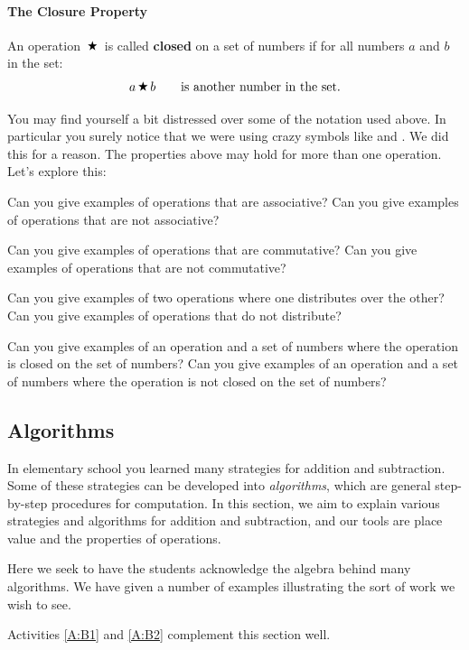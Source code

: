 \paragraph{The Closure Property}
An operation $\,\text{\ding{72}}\,$ is called \textbf{closed} on a set of numbers if for all
numbers $a$ and $b$ in the set:
\[
a \,\text{\ding{72}}\, b \qquad \textrm{is another number in the set}.  
\]


You may find yourself a bit distressed over some of the notation used
above. In particular you surely notice that we were using crazy
symbols like  and . We did this for a reason. The
properties above may hold for more than one operation. Let's explore
this:

\begin{question}
Can you give examples of operations that are associative? Can you give
examples of operations that are not associative?
\end{question}
\QM

\begin{question}
Can you give examples of operations that are commutative? Can you give
examples of operations that are not commutative?
\end{question}
\QM


\begin{question}
Can you give examples of two operations where one distributes over the
other? Can you give examples of operations that do not distribute?
\end{question}
\QM


\begin{question}
Can you give examples of an operation and a set of numbers where 
the operation is closed on the set of numbers?  Can you give examples 
of an operation and a set of numbers where 
the operation is not closed on the set of numbers? 
\end{question}
\QM


\subsection{Algorithms}
In elementary school you learned many strategies for addition and subtraction.  
Some of these strategies can be developed into \emph{algorithms}, which are general step-by-step procedures 
for computation.  In this section, we aim to explain various strategies and algorithms for addition and subtraction, and our tools are place value and the properties of operations.
\begin{teachingnote}
Here we seek to have the students acknowledge the algebra behind many
algorithms. We have given a number of examples illustrating the sort
of work we wish to see.
\end{teachingnote}
\begin{activitynote}
Activities \ref{A:B1} and \ref{A:B2} complement  this section well.  %
\end{activitynote}

